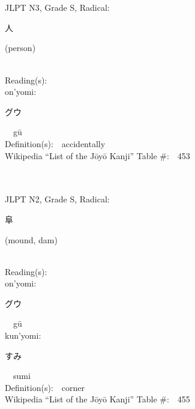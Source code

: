 \begin{multicols}{2}
\ \ \\
{\fontsize{34pt}{40pt}  }\ \ \\  %
{JLPT N3, Grade S, Radical:\ \ {\begin{CJK}{UTF8}{min} 人 \end{CJK}} (person) } \\
Reading(s):\ \ \\
{\hspace*{1em}}on'yomi:\ \ \\
{\hspace*{2em}}{\begin{CJK}{UTF8}{min} グウ \end{CJK}}\ \ g\=u\ \ \\
Definition(s):\ \ accidentally \\
Wikipedia ``List of the J\=oy\=o Kanji'' Table \#:\ \ 453 \\
\ \ \\
{\fontsize{34pt}{40pt}  }\ \ \\  %
{JLPT N2, Grade S, Radical:\ \ {\begin{CJK}{UTF8}{min} 阜 \end{CJK}} (mound, dam) } \\
Reading(s):\ \ \\
{\hspace*{1em}}on'yomi:\ \ \\
{\hspace*{2em}}{\begin{CJK}{UTF8}{min} グウ \end{CJK}}\ \ g\=u\ \ \\
{\hspace*{1em}}kun'yomi:\ \ \\
{\hspace*{2em}}{\begin{CJK}{UTF8}{min} すみ \end{CJK}}\ \ sumi\ \ \\
Definition(s):\ \ corner \\
Wikipedia ``List of the J\=oy\=o Kanji'' Table \#:\ \ 455 \\
\ \ \\
{\fontsize{34pt}{40pt}  }\ \ \\  %

\end{multicols}
